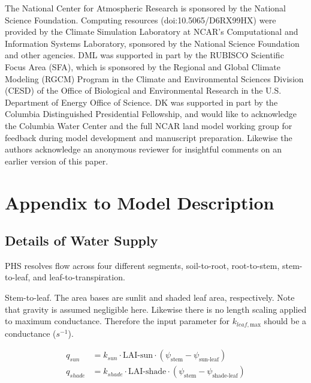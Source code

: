 \documentclass[draft,linenumbers]{agujournal}
\begin{document}
The National Center for Atmospheric Research is sponsored by the National Science Foundation. Computing resources (doi:10.5065/D6RX99HX) were provided by the Climate Simulation Laboratory at NCAR's Computational and Information Systems Laboratory, sponsored by the National Science Foundation and other agencies. DML was supported in part by the RUBISCO Scientific Focus Area (SFA), which is sponsored by the Regional and Global Climate Modeling (RGCM) Program in the Climate and Environmental Sciences Division (CESD) of the Office of Biological and Environmental Research in the U.S. Department of Energy Office of Science. DK was supported in part by the Columbia Distinguished Presidential Fellowship, and would like to acknowledge the Columbia Water Center and the full NCAR land model working group for feedback during model development and manuscript preparation. Likewise the authors acknowledge an anonymous reviewer for insightful comments on an earlier version of this paper.


\clearpage    

\clearpage

\appendix


\section{Appendix to Model Description}

\subsection{Details of Water Supply}

PHS resolves flow across four different segments, soil-to-root, root-to-stem, stem-to-leaf, and leaf-to-transpiration.

Stem-to-leaf. The area bases are sunlit and shaded leaf area, respectively. 
Note that gravity is assumed negligible here. 
Likewise there is no length scaling applied to maximum conductance. 
Therefore the input parameter for $k_{leaf,\text{max}}$ should be a conductance ($s^{-1}$).

\begin{linenomath*} \begin{equation} \begin{aligned}
q_{sun} &= k_{sun} \cdot \text{LAI-sun}  \cdot \left( \psi_{\text{stem}}-\psi_{\text{sun-leaf}}\right) \\
q_{shade} &= k_{shade} \cdot \text{LAI-shade} \cdot  \left( \psi_{\text{stem}}-\psi_{\text{shade-leaf}}\right)
\end{aligned} \end{equation} \end{linenomath*}
\end{document}
